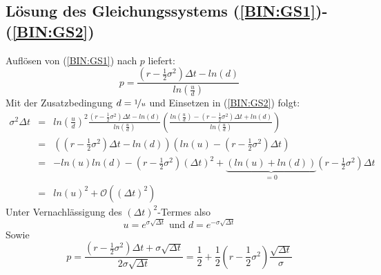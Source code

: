 \subsection{Lösung des Gleichungssystems (\ref{BIN:GS1})-(\ref{BIN:GS2})}
\label{Anhang:GSParameter}

Auflösen von (\ref{BIN:GS1}) nach $p$ liefert:
\begin{equation*}
p = \frac{\left(r-\frac{1}{2}\sigma^2\right)\Delta t - ln(d)}{ln\left(\frac{u}{d}\right)}
\end{equation*}
Mit der Zusatzbedingung $d = \nicefrac{1}{u}$ und Einsetzen in (\ref{BIN:GS2}) folgt:
\begin{eqnarray*}
\sigma^2\Delta t & = & ln\left(\frac{u}{d}\right)^2\frac{\left(r-\frac{1}{2}\sigma^2\right)\Delta t - ln(d)}{ln\left(\frac{u}{d}\right)}\left(\frac{ln\left(\frac{u}{d}\right)-\left(r-\frac{1}{2}\sigma^2\right)\Delta t + ln(d)}{ln\left(\frac{u}{d}\right)}\right) \\
& = & \left(\left(r-\frac{1}{2}\sigma^2\right)\Delta t - ln(d)\right)\left(ln(u) - \left(r-\frac{1}{2}\sigma^2\right)\Delta t\right) \\
& = & -ln(u)ln(d) - \left(r-\frac{1}{2}\sigma^2\right)(\Delta t)^2 + \underbrace{(ln(u)+ln(d))}_{=0}\left(r-\frac{1}{2}\sigma^2\right)\Delta t \\
& = & ln(u)^2 + \mathcal{O}\left((\Delta t)^2\right)
\end{eqnarray*}
Unter Vernachlässigung des $\left(\Delta t\right)^2$-Termes also
\begin{equation*}
u = e^{\sigma\sqrt{\Delta t}} \text{ und } d = e^{-\sigma\sqrt{\Delta t}}
\end{equation*}
Sowie
\begin{equation*}
p = \frac{\left(r-\frac{1}{2}\sigma^2\right)\Delta t + \sigma\sqrt{\Delta t}}{2\sigma\sqrt{\Delta t}} =\frac{1}{2} + \frac{1}{2}\left(r-\frac{1}{2}\sigma^2\right)\frac{\sqrt{\Delta t}}{\sigma} 
\end{equation*}






